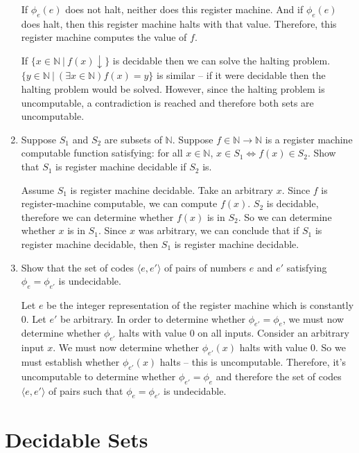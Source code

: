 \documentclass[10pt,\jkfside,a4paper]{article}
\begin{document}
\begin{enumerate}
If $\phi_e(e)$ does not halt, neither does this register machine. And if
$\phi_e(e)$ does halt, then this register machine halts with that value.
Therefore, this register machine computes the value of $f$.

If $\{x \in \mathbb{N}\ |\ f(x)\downarrow\}$ is decidable then we can solve
the halting problem. $\{y \in \mathbb{N}\ |\ (\exists x \in \mathbb{N}) f
(x) = y\}$ is similar -- if it were decidable then the halting
problem would be solved. However, since the halting problem is uncomputable,
a contradiction is reached and therefore both sets are uncomputable.

\item Suppose $S_1$ and $S_2$ are subsets of $\mathbb{N}$. Suppose
$f \in \mathbb{N} \to \mathbb{N}$ is a register machine computable function
satisfying: for all $x \in \mathbb{N}$, $x \in S_1 \Longleftrightarrow f(x)
\in S_2$. Show that $S_1$ is register machine decidable if $S_2$ is.

Assume $S_1$ is register machine decidable. Take an arbitrary $x$. Since $f$
is register-machine computable, we can compute $f(x)$. $S_2$ is decidable,
therefore we can determine whether $f(x)$ is in $S_2$. So we can determine
whether $x$ is in $S_1$. Since $x$ was arbitrary, we can conclude that if
$S_1$ is register machine decidable, then $S_1$ is register machine decidable.

\item Show that the set of codes $ \langle e, e' \rangle $ of pairs of
numbers $e$ and $e'$ satisfying $\phi_e = \phi_{e'}$ is undecidable.

Let $e$ be the integer representation of the register machine which is
constantly 0. Let $e'$ be arbitrary. In order to determine whether
$\phi_{e'} = \phi_e$, we must now determine whether $\phi_{e'}$ halts with
value 0 on all inputs. Consider an arbitrary input $x$. We must now
determine whether $\phi_{e'}(x)$ halts with value 0. So we must establish
whether $\phi_{e'}(x)$ halts -- this is uncomputable. Therefore, it's
uncomputable to determine whether $\phi_{e'} = \phi_e$ and therefore the set
of codes $ \langle e, e' \rangle $ of pairs such that $\phi_e = \phi_{e'}$
is undecidable.

\end{enumerate}

\section{Decidable Sets}
\end{document}
